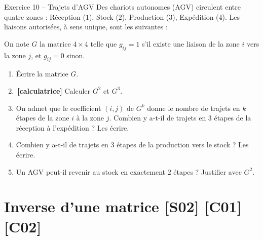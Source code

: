 \documentclass[a4paper,11pt]{article}
\newcommand{\calc}{\,{\color{uimmred}\small\textbf{[calculatrice]}}}
\begin{document}
\begin{exo}{Exercice 10 -- Trajets d'AGV}
\label{exo:10}
Des chariots autonomes (AGV) circulent entre quatre zones : Réception ($1$), Stock ($2$), Production ($3$), Expédition ($4$). Les liaisons autorisées, à sens unique, sont les suivantes :
\begin{center}
\end{center}
On note $G$ la matrice $4\times 4$ telle que $g_{ij} = 1$ s'il existe une liaison de la zone $i$ vers la zone $j$, et $g_{ij} = 0$ sinon.
\begin{enumerate}[label=\alph*)]
  \item Écrire la matrice $G$.
  \item \calc{} Calculer $G^2$ et $G^3$.
  \item On admet que le coefficient $(i,j)$ de $G^k$ donne le nombre de trajets en $k$ étapes de la zone $i$ à la zone $j$. Combien y a-t-il de trajets en $3$ étapes de la réception à l'expédition ? Les écrire.
  \item Combien y a-t-il de trajets en $3$ étapes de la production vers le stock ? Les écrire.
  \item Un AGV peut-il revenir au stock en exactement $2$ étapes ? Justifier avec $G^2$.
\end{enumerate}
\end{exo}

\needspace{7cm}
\section{Inverse d'une matrice \hfill {\normalsize\color{uimmred}[S02] [C01] [C02]}}
\end{document}
